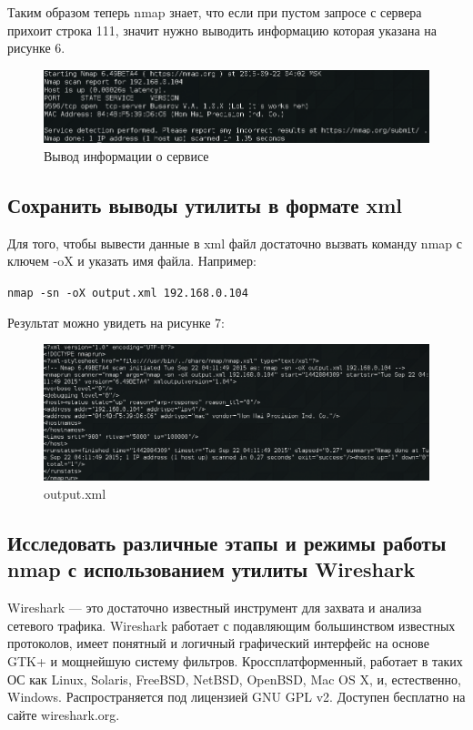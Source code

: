 \documentclass[11pt, a4paper]{article}		%
\begin{document}
Таким образом теперь nmap знает, что если при пустом запросе с сервера прихоит строка 111, значит нужно выводить информацию которая указана на рисунке 6.

\begin{figure}[h!]
\centering
\includegraphics[scale=0.8]{res/6}
\caption{Вывод информации о сервисе}
\end{figure}




\subsection{Сохранить выводы утилиты в формате xml}

Для того, чтобы вывести данные в xml файл достаточно вызвать команду nmap с ключем -oX и указать имя файла. Например: 

\verb'nmap -sn -oX output.xml 192.168.0.104'

Результат можно увидеть на рисунке 7:

\begin{figure}[h!]
\centering
\includegraphics[scale=0.8]{res/7}
\caption{output.xml}
\end{figure}


\subsection{Исследовать различные этапы и режимы работы nmap с использованием утилиты Wireshark}

Wireshark — это достаточно известный инструмент для захвата и анализа сетевого трафика.
Wireshark работает с подавляющим большинством известных протоколов, имеет понятный и логичный графический интерфейс на основе GTK+ и мощнейшую систему фильтров.
Кроссплатформенный, работает в таких ОС как Linux, Solaris, FreeBSD, NetBSD, OpenBSD, Mac OS X, и, естественно, Windows. Распространяется под лицензией GNU GPL v2. Доступен бесплатно на сайте wireshark.org.
\end{document}
